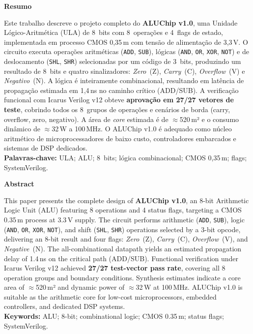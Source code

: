 \documentclass[12pt,a4paper]{article}
\begin{document}
\newpage

\begin{center}{\large\bfseries\color{alublue} Resumo}\end{center}
\begin{unidadebox}[Resumo]
Este trabalho descreve o projeto completo do \textbf{ALUChip v1.0}, uma Unidade Lógico-Aritmética (ULA) de 8~bits com 8~operações e 4~flags de estado, implementada em processo CMOS 0,35\,\textmu m com tensão de alimentação de 3,3\,V. O circuito executa operações aritméticas (\texttt{ADD}, \texttt{SUB}), lógicas (\texttt{AND}, \texttt{OR}, \texttt{XOR}, \texttt{NOT}) e de deslocamento (\texttt{SHL}, \texttt{SHR}) selecionadas por um código de 3~bits, produzindo um resultado de 8~bits e quatro sinalizadores: \textit{Zero}~(Z), \textit{Carry}~(C), \textit{Overflow}~(V) e \textit{Negativo}~(N). A lógica é inteiramente combinacional, resultando em latência de propagação estimada em 1,4\,ns no caminho crítico (ADD/SUB). A verificação funcional com Icarus Verilog v12 obteve \textbf{aprovação em 27/27 vetores de teste}, cobrindo todos os 8~grupos de operações e cenários de borda (carry, overflow, zero, negativo). A área de \textit{core} estimada é de $\approx$520\,\textmu m² e o consumo dinâmico de $\approx$32\,\textmu W a 100\,MHz. O ALUChip v1.0 é adequado como núcleo aritmético de microprocessadores de baixo custo, controladores embarcados e sistemas de DSP dedicados.\\[4pt]
\textbf{Palavras-chave:} ULA; ALU; 8~bits; lógica combinacional; CMOS 0,35\,\textmu m; flags; SystemVerilog.
\end{unidadebox}

\vspace{6pt}
\begin{center}{\large\bfseries\color{alublue} Abstract}\end{center}
\begin{unidadebox}[Abstract]
This paper presents the complete design of \textbf{ALUChip v1.0}, an 8-bit Arithmetic Logic Unit (ALU) featuring 8 operations and 4 status flags, targeting a CMOS 0.35\,\textmu m process at 3.3\,V supply. The circuit performs arithmetic (\texttt{ADD}, \texttt{SUB}), logic (\texttt{AND}, \texttt{OR}, \texttt{XOR}, \texttt{NOT}), and shift (\texttt{SHL}, \texttt{SHR}) operations selected by a 3-bit opcode, delivering an 8-bit result and four flags: \textit{Zero}~(Z), \textit{Carry}~(C), \textit{Overflow}~(V), and \textit{Negative}~(N). The all-combinational datapath yields an estimated propagation delay of 1.4\,ns on the critical path (ADD/SUB). Functional verification under Icarus Verilog v12 achieved \textbf{27/27 test-vector pass rate}, covering all 8 operation groups and boundary conditions. Synthesis estimates indicate a core area of $\approx$520\,\textmu m² and dynamic power of $\approx$32\,\textmu W at 100\,MHz. ALUChip v1.0 is suitable as the arithmetic core for low-cost microprocessors, embedded controllers, and dedicated DSP systems.\\[4pt]
\textbf{Keywords:} ALU; 8-bit; combinational logic; CMOS 0.35\,\textmu m; status flags; SystemVerilog.
\end{unidadebox}
\end{document}
